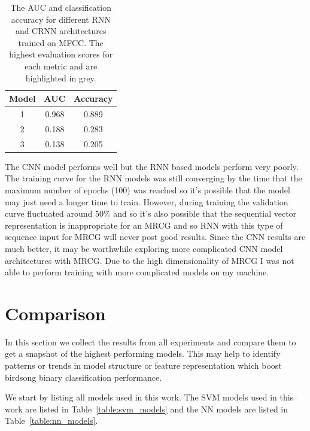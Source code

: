 \begin{table}[ht]
\begin{center}
\begin{tabular}{c c c}
\toprule
Model & AUC & Accuracy \\ [0.5ex]
\midrule
1 & \cellcolor{lightgray} 0.968 & \cellcolor{lightgray} 0.889 \\
2 & 0.188 & 0.283 \\
3 & 0.138 & 0.205 \\
\bottomrule
\end{tabular}
\caption{The AUC and classification accuracy for different RNN and CRNN
architectures trained on MFCC\@. The highest evaluation scores for each metric
and are highlighted in grey.}\label{table:rnn_mrcg_results}
\end{center}
\end{table}

The CNN model performs well but the RNN based models perform very poorly. The
training curve for the RNN models was still converging by the time that the
maximum number of epochs (100) was reached so it's possible that the model may
just need a longer time to train. However, during training the validation curve
fluctuated around 50\% and so it's also possible that the sequential vector
representation is inappropriate for an MRCG and so RNN with this type of
sequence input for MRCG will never post good results. Since the CNN results are
much better, it may be worthwhile exploring more complicated CNN model
architectures with MRCG\@. Due to the high dimensionality of MRCG I was not able
to perform training with more complicated models on my machine.

\section{Comparison}

In this section we collect the results from all experiments and compare them to
get a snapshot of the highest performing models. This may help to identify
patterns or trends in model structure or feature representation which boost
birdsong binary classification performance.

We start by listing all models used in this work. The SVM models used in this
work are listed in Table~\ref{table:svm_models} and the NN models are listed in
Table~\ref{table:nn_models}.


